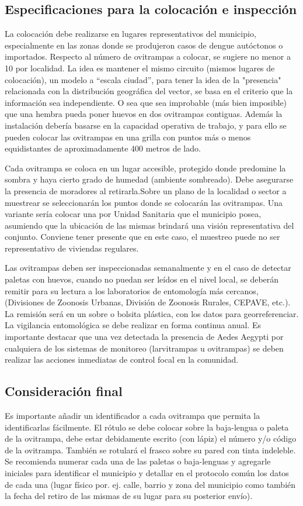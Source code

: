 \subsection{Especificaciones para la colocación e inspección}
La colocación debe realizarse en lugares representativos del municipio,
especialmente en las zonas donde se produjeron casos de dengue autóctonos
o importados. Respecto al número de ovitrampas a colocar, se sugiere no
menor a 10 por localidad. La idea es mantener el mismo circuito (mismos
lugares de colocación), un modelo a “escala ciudad”, para tener la idea de
la "presencia" relacionada con la distribución geográfica del vector, se
basa en el criterio que la información sea independiente. O sea que sea
improbable (más bien imposible) que una hembra pueda poner huevos en dos
ovitrampas contiguas. Además la instalación debería basarse en la capacidad
operativa de trabajo, y para ello se pueden colocar las ovitrampas en una
grilla con puntos más o menos equidistantes de aproximadamente 400 metros
de lado.

Cada ovitrampa se coloca en un lugar accesible, protegido donde predomine
la sombra y haya cierto grado de humedad (ambiente sombreado). Debe asegurarse
la presencia de moradores al retirarla.Sobre un plano de la localidad o
sector a muestrear se seleccionarán los puntos donde se colocarán las
ovitrampas. Una variante sería colocar una por Unidad Sanitaria que el
municipio posea, asumiendo que la ubicación de las mismas brindará una
visión representativa del conjunto. Conviene tener presente que en este
caso, el muestreo puede no ser representativo de viviendas regulares.

Las ovitrampas deben ser inspeccionadas semanalmente y en el caso de detectar
paletas con huevos, cuando no puedan ser leídos en el nivel local, se deberán
remitir para su lectura a los laboratorios de entomología más cercanos,
(Divisiones de Zoonosis Urbanas, División de Zoonosis Rurales, CEPAVE, etc.).
La remisión será en un sobre o bolsita plástica, con los datos para georreferenciar.
La vigilancia entomológica se debe realizar en forma continua anual. Es
importante destacar que una vez detectada la presencia de Aedes Aegypti por
cualquiera de los sistemas de monitoreo (larvitrampas u ovitrampas) se deben
realizar las acciones inmediatas de control focal en la comunidad.

\subsection{Consideración final}
Es importante añadir un identificador a cada ovitrampa que permita la
identificarlas fácilmente. El rótulo se debe colocar sobre la baja-lengua
o paleta de la ovitrampa, debe estar debidamente escrito (con lápiz) el
número y/o código de la ovitrampa. También se rotulará el frasco sobre
su pared con tinta indeleble. Se recomienda numerar cada una de las paletas
o baja-lenguas y agregarle iniciales para identificar el municipio y
detallar en el protocolo común los datos de cada una (lugar físico por.
ej. calle, barrio y zona del municipio como también la fecha del retiro
de las mismas de su lugar para su posterior envío).

